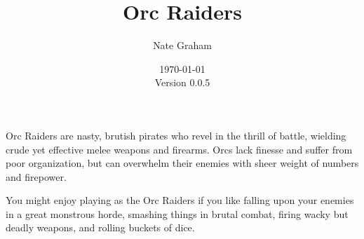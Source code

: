 








\title{Orc Raiders}
\author{Nate Graham}
\date{\today\\ Version 0.0.5}

\maketitle

Orc Raiders are nasty, brutish pirates who revel in the thrill of battle, wielding crude yet effective melee weapons and firearms. Orcs lack finesse and suffer from poor organization, but can overwhelm their enemies with sheer weight of numbers and firepower.

You might enjoy playing as the Orc Raiders if you like falling upon your enemies in a great monstrous horde, smashing things in brutal combat, firing wacky but deadly weapons, and rolling buckets of dice.







\newcommand{\BruteWeapon}[1][3+]{Brute Weapon: R0 A2 {#1} D1}
\newcommand{\BustaBombs}[1][4+]{Busta bombs: R0 A1 {#1} D5 Critical 10, Deadly D5, Slow, Unstable 2, May only be used against Vehicle or Monster models}
\newcommand{\Chopper}[1][4+]{Chopper: R0 A1 {#1} D1}
\newcommand{\ClawsAndTeeth}[1][3+]{Claws and Teeth: R0 A2 {#1} D0}
\newcommand{\CuttingTorch}[1][4+]{Cutting Torch: R0 A1 {#1} D5 [Deadly 2, Slow]}
\newcommand{\HugeBossChopper}[1][2+]{Huge Boss Chopper: R0 A4 {#1} D4 [Deadly 2]}
\newcommand{\Knife}[1][4+]{Knife: R0 A1 {#1} D0}
\newcommand{\PoweredBossWeapon}[1][3+]{Powered Boss Weapon: R0 A2 {#1} D6 [Deadly D5+1]}
\newcommand{\PoweredBruteWeapon}[1][4+]{Powered Brute Weapon: R0 A1 {#1} D6 [Deadly D5]}
\newcommand{\RustyBlade}[1][7+]{Rusty Blade: R0 A1 {#1} D0}

\newcommand{\ChoppyBlades}[1][4+]{Choppy Blades: R0 A5 {#1} D2}
\newcommand{\PoweredWeapon}[1][3+]{Powered Weapon: R0 A2 {#1} D6 [Deadly D5+1] (each additional one increased the A value by 2)}
\newcommand{\SpikyRam}[1][4+]{Spiky Ram: R0 A1 {#1} D5 [Deadly 4]}


\newcommand{\BikerGuns}[1][8+]{Biker Guns: R16 A4 {#1} D1 [Assault]}
\newcommand{\Blunderbuss}[1][6+]{Blunderbuss: R10 A1 {#1} D0}
\newcommand{\BossGun}[1][8+]{Boss Gun: R16 A2 {#1} D2 [Assault, Deadly 2]}
\newcommand{\BruteGun}[1][8+]{Brute Gun: R16 A1 {#1} D1 [Assault]}
\newcommand{\Gun}[1][8+]{Gun: R16 A1 {#1} D1 [Assault]}
\newcommand{\HeavyCannon}[1][6+]{Heavy Cannon R20 A2 {#1} D4 [Area Effect, Deadly 2, Suppressive 1]}
\newcommand{\HeavyGun}[1][8+]{Heavy Gun: R20 A2 {#1} D2 [Assault, Suppressive 0]}
\newcommand{\MegabruteGun}[1][8+]{Megabrute Gun: R16 A2 {#1} D1 [Assault]}
\newcommand{\Pistol}[1][8+]{Pistol: R8 A1 {#1} D1 [Assault]}


